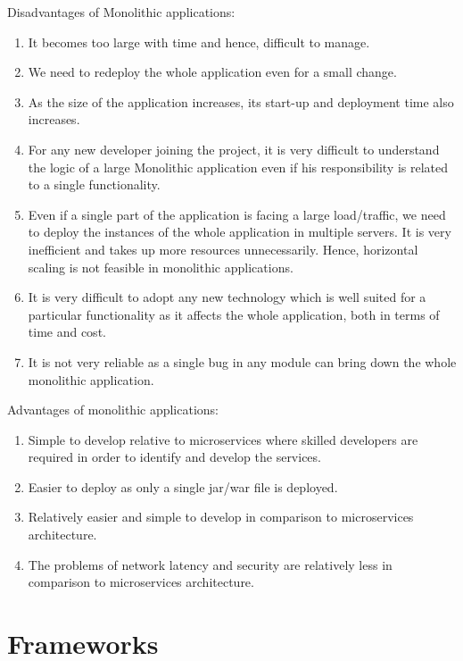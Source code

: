 Disadvantages of Monolithic applications:
\begin{enumerate}
      \item
            It becomes too large with time and hence, difficult to manage.
      \item
            We need to redeploy the whole application even for a small change.
      \item
            As the size of the application increases, its start-up and deployment time also increases.
      \item
            For any new developer joining the project, it is very difficult to understand the logic of a large Monolithic application even if his responsibility is related to a single functionality.
      \item
            Even if a single part of the application is facing a large load/traffic, we need to deploy the instances of the whole application in multiple servers. It is very inefficient and takes up more resources unnecessarily. Hence, horizontal scaling is not feasible in monolithic applications.
      \item
            It is very difficult to adopt any new technology which is well suited for a particular functionality as it affects the whole application, both in terms of time and cost.
      \item
            It is not very reliable as a single bug in any module can bring down the whole monolithic application.
\end{enumerate}
Advantages of monolithic applications:
\begin{enumerate}
      \item
            Simple to develop relative to microservices where skilled developers are required in order to identify and develop the services.
      \item
            Easier to deploy as only a single jar/war file is deployed.
      \item
            Relatively easier and simple to develop in comparison to microservices architecture.
      \item
            The problems of network latency and security are relatively less in comparison to microservices architecture.
\end{enumerate}


\section{Frameworks}
